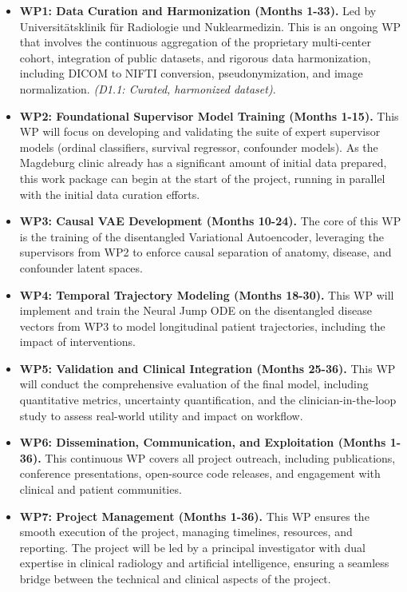 \documentclass[11pt, a4paper]{article}
\begin{document}
\begin{itemize}
    \item \textbf{WP1: Data Curation and Harmonization (Months 1-33).} Led by Universitätsklinik für Radiologie und Nuklearmedizin. This is an ongoing WP that involves the continuous aggregation of the proprietary multi-center cohort, integration of public datasets, and rigorous data harmonization, including DICOM to NIFTI conversion, pseudonymization, and image normalization. \textit{(D1.1: Curated, harmonized dataset)}.
    \item \textbf{WP2: Foundational Supervisor Model Training (Months 1-15).} This WP will focus on developing and validating the suite of expert supervisor models (ordinal classifiers, survival regressor, confounder models). As the Magdeburg clinic already has a significant amount of initial data prepared, this work package can begin at the start of the project, running in parallel with the initial data curation efforts.
    \item \textbf{WP3: Causal VAE Development (Months 10-24).} The core of this WP is the training of the disentangled Variational Autoencoder, leveraging the supervisors from WP2 to enforce causal separation of anatomy, disease, and confounder latent spaces.
    \item \textbf{WP4: Temporal Trajectory Modeling (Months 18-30).} This WP will implement and train the Neural Jump ODE on the disentangled disease vectors from WP3 to model longitudinal patient trajectories, including the impact of interventions.
    \item \textbf{WP5: Validation and Clinical Integration (Months 25-36).} This WP will conduct the comprehensive evaluation of the final model, including quantitative metrics, uncertainty quantification, and the clinician-in-the-loop study to assess real-world utility and impact on workflow.
    \item \textbf{WP6: Dissemination, Communication, and Exploitation (Months 1-36).} This continuous WP covers all project outreach, including publications, conference presentations, open-source code releases, and engagement with clinical and patient communities.
    \item \textbf{WP7: Project Management (Months 1-36).} This WP ensures the smooth execution of the project, managing timelines, resources, and reporting. The project will be led by a principal investigator with dual expertise in clinical radiology and artificial intelligence, ensuring a seamless bridge between the technical and clinical aspects of the project.
\end{itemize}
\end{document}
